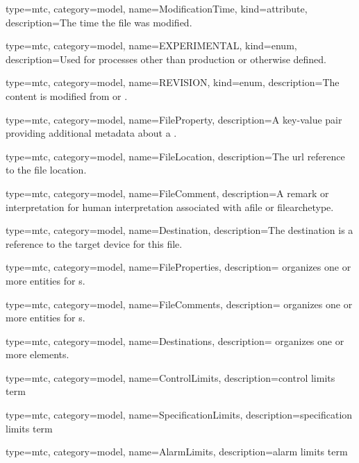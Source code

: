 {
  type=mtc,
  category=model,
  name={ModificationTime},
  kind={attribute},
  description={The time the file was modified.}
}

{
  type=mtc,
  category=model,
  name={EXPERIMENTAL},
  kind={enum},
  description={Used for processes other than production or otherwise defined.}
}


{
  type=mtc,
  category=model,
  name={REVISION},
  kind={enum},
  description={The content is modified from  or .}
}

{
  type=mtc,
  category=model,
  name={FileProperty},
  description={A key-value pair providing additional metadata about a .}
}

{
  type=mtc,
  category=model,
  name={FileLocation},
  description={The \gls{url} reference to the file location.}
}

{
  type=mtc,
  category=model,
  name={FileComment},
  description={A remark or interpretation for human interpretation associated with a\gls{file} or \gls{filearchetype}.}
}

{
  type=mtc,
  category=model,
  name={Destination},
  description={The \gls{destination} is a reference to the target \gls{device} for this \gls{file}.}
}

{
  type=mtc,
  category=model,
  name={FileProperties},
  description={ \glspl{organize} one or more  entities for s.}
}

{
  type=mtc,
  category=model,
  name={FileComments},
  description={ \glspl{organize} one or more  entities for s.}
}

{
  type=mtc,
  category=model,
  name={Destinations},
  description={ \glspl{organize} one or more  elements.}
}

{
  type=mtc,
  category=model,
  name={ControlLimits},
  description={\glsdesc{control limits term}}
}

{
  type=mtc,
  category=model,
  name={SpecificationLimits},
  description={\glsdesc{specification limits term}}
}

{
  type=mtc,
  category=model,
  name={AlarmLimits},
  description={\glsdesc{alarm limits term}}
}
